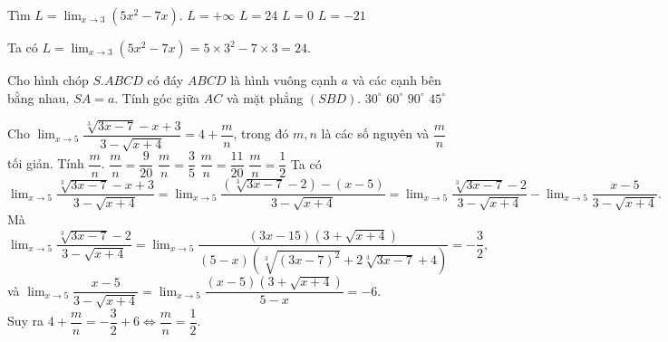\begin{ex}%
	Tìm $L=\displaystyle\lim_{x \to 3} \left(5x^2-7x\right)$.
	\choice
	{$L=+\infty$}
	{\True $L=24$}
	{$L=0$}
	{$L=-21$}
	\loigiai
	{
		Ta có $L=\displaystyle\lim_{x \to 3} \left(5x^2-7x\right)=5\times3^2-7\times3=24$.
		
	}
\end{ex}

\begin{ex}%
	Cho hình chóp $S.ABCD$ có đáy $ABCD$ là hình vuông cạnh $a$ và các cạnh bên bằng nhau, $SA=a$. Tính góc giữa $AC$ và mặt phẳng $(SBD)$.
	\choice
	{$30^\circ$}
	{$60^\circ$}
	{\True $90^\circ$}
	{$45^\circ$}
\end{ex}

\begin{ex}%
	Cho $\displaystyle\lim_{x \to 5}\dfrac{\sqrt[3]{3x-7}-x+3}{3-\sqrt{x+4}}=4+\dfrac{m}{n}$, trong đó $m,n$ là các số nguyên và $\dfrac{m}{n}$ tối giản. Tính $\dfrac{m}{n}$.
	\choice
	{$\dfrac{m}{n}=\dfrac{9}{20}$}
	{$\dfrac{m}{n}=\dfrac{3}{5}$}
	{$\dfrac{m}{n}=\dfrac{11}{20}$}
	{\True $\dfrac{m}{n}=\dfrac{1}{2}$}
	\loigiai
	{Ta có 
		$\displaystyle\lim_{x \to 5}\dfrac{\sqrt[3]{3x-7}-x+3}{3-\sqrt{x+4}}=\displaystyle\lim_{x \to 5}\dfrac{\left(\sqrt[3]{3x-7}-2\right)-(x-5)}{3-\sqrt{x+4}}=\displaystyle\lim_{x \to 5}\dfrac{\sqrt[3]{3x-7}-2}{3-\sqrt{x+4}}-\displaystyle\lim_{x \to 5}\dfrac{x-5}{3-\sqrt{x+4}}.$\\
		Mà $\displaystyle\lim_{x \to 5}\dfrac{\sqrt[3]{3x-7}-2}{3-\sqrt{x+4}}=\displaystyle\lim_{x \to 5}\dfrac{(3x-15)\left(3+\sqrt{x+4}\right)}{(5-x)\left(\sqrt[3]{(3x-7)^2}+2\sqrt[3]{3x-7}+4\right)}=-\dfrac{3}{2},$\\ và $\displaystyle\lim_{x \to 5}\dfrac{x-5}{3-\sqrt{x+4}}=\displaystyle\lim_{x \to 5}\dfrac{(x-5)\left(3+\sqrt{x+4}\right)}{5-x}=-6.$\\
		Suy ra $4+\dfrac{m}{n}=-\dfrac{3}{2}+6 \Leftrightarrow \dfrac{m}{n}=\dfrac{1}{2}.$
	}
\end{ex}

